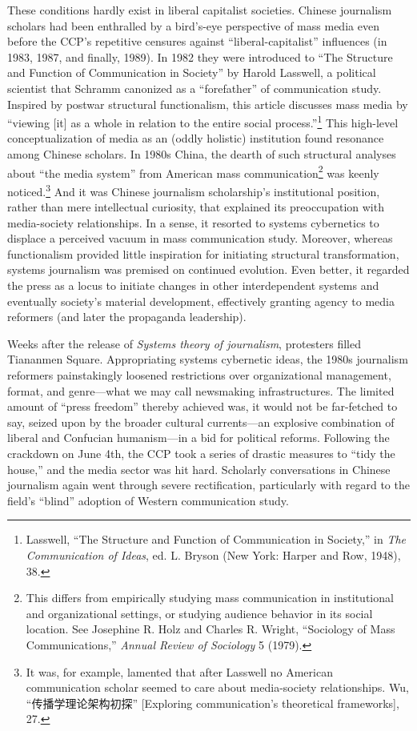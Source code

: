 \documentclass{tufte-handout}
\begin{document}
\begin{CJK*}{UTF8}{gbsn}
These conditions hardly exist in liberal capitalist societies. Chinese
journalism scholars had been enthralled by a bird's-eye perspective of
mass media even before the CCP's repetitive censures against
``liberal-capitalist'' influences (in 1983, 1987, and finally, 1989). In
1982 they were introduced to ``The Structure and Function of
Communication in Society'' by Harold Lasswell, a political scientist
that Schramm canonized as a ``forefather'' of communication study.
Inspired by postwar structural functionalism, this article discusses
mass media by ``viewing {[}it{]} as a whole in relation to the entire
social process.''\footnote{Lasswell, ``The Structure and Function of
  Communication in Society,'' in \emph{The Communication of Ideas}, ed.
  L. Bryson (New York: Harper and Row, 1948), 38.} This high-level
conceptualization of media as an (oddly holistic) institution found
resonance among Chinese scholars. In 1980s China, the dearth of such
structural analyses about ``the media system'' from American mass
communication\footnote{This differs from empirically studying mass
  communication in institutional and organizational settings, or
  studying audience behavior in its social location. See Josephine R.
  Holz and Charles R. Wright, ``Sociology of Mass Communications,''
  \emph{Annual Review of Sociology} 5 (1979).} was keenly
noticed.\footnote{It was, for example, lamented that after Lasswell no
  American communication scholar seemed to care about media-society
  relationships. Wu, ``传播学理论架构初探'' {[}Exploring communication's
  theoretical frameworks{]}, 27.} And it was Chinese journalism
scholarship's institutional position, rather than mere intellectual
curiosity, that explained its preoccupation with media-society
relationships. In a sense, it resorted to systems cybernetics to
displace a perceived vacuum in mass communication study. Moreover,
whereas functionalism provided little inspiration for initiating
structural transformation, systems journalism was premised on continued
evolution. Even better, it regarded the press as a locus to initiate
changes in other interdependent systems and eventually society's
material development, effectively granting agency to media reformers
(and later the propaganda leadership).

Weeks after the release of \emph{Systems theory of journalism},
protesters filled Tiananmen Square. Appropriating systems cybernetic
ideas, the 1980s journalism reformers painstakingly loosened
restrictions over organizational management, format, and genre---what we
may call newsmaking infrastructures. The limited amount of ``press
freedom'' thereby achieved was, it would not be far-fetched to say,
seized upon by the broader cultural currents---an explosive combination
of liberal and Confucian humanism---in a bid for political reforms.
Following the crackdown on June 4th, the CCP took a series of drastic
measures to ``tidy the house,'' and the media sector was hit hard.
Scholarly conversations in Chinese journalism again went through severe
rectification, particularly with regard to the field's ``blind''
adoption of Western communication study.


\end{CJK*}
\end{document}
